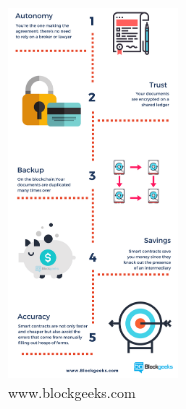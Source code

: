 \begin{figure}[h]
\centering
\includegraphics[width=0.4\textwidth]{images/smartcontracts.png}
\caption{\label{fig:Smartcontracts}www.blockgeeks.com}
\end{figure}


